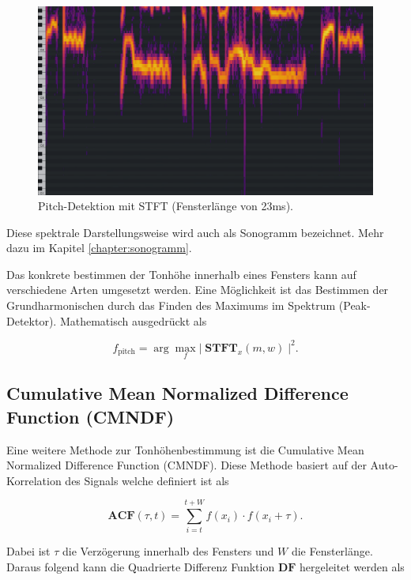 \begin{figure}
	\centering
	\includegraphics[width=\textwidth]{papers/autotune/images/Pianoscale_Example_Detuned_STFT.png}
	\caption{Pitch-Detektion mit STFT (Fensterlänge von 23\;ms).}
    \label{autotune:fig:pitchDetektionSTFT}
\end{figure}

Diese spektrale Darstellungsweise wird auch als Sonogramm bezeichnet. Mehr dazu im Kapitel \ref{chapter:sonogramm}.


Das konkrete bestimmen der Tonhöhe innerhalb eines Fensters kann auf verschiedene Arten umgesetzt werden.
Eine Möglichkeit ist das Bestimmen der Grundharmonischen durch das Finden des Maximums im Spektrum (Peak-Detektor).
Mathematisch ausgedrückt als

\begin{equation}
    f_{\text{pitch}}
    =
    \arg\max_{f}{\left | \; \mathbf{STFT}_x(m, w) \; \right |}^2.
\end{equation}


\subsection{Cumulative Mean Normalized Difference Function (CMNDF)
\label{autotune:subsection:cumultativeMeanNormalizedDifferenceFunction}}
Eine weitere Methode zur Tonhöhenbestimmung ist die Cumulative Mean Normalized Difference Function (CMNDF).
Diese Methode basiert auf der Auto-Korrelation des Signals welche definiert ist als

\begin{equation}
    \mathbf{ACF}(\tau, t)
    =
    \sum_{i=t}^{t+W}f(x_i)\cdot f(x_i+\tau).
\end{equation}

Dabei ist $\tau$ die Verzögerung innerhalb des Fensters und $W$ die Fensterlänge.
Daraus folgend kann die Quadrierte Differenz Funktion $\mathbf{DF}$ hergeleitet werden als

